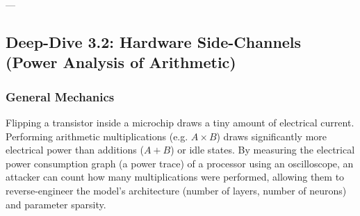 \documentclass{article}
\begin{document}
---

\subsection{Deep-Dive 3.2: Hardware Side-Channels (Power Analysis of Arithmetic)}

\subsubsection{General Mechanics}
Flipping a transistor inside a microchip draws a tiny amount of electrical current. Performing arithmetic multiplications (e.g. $A \times B$) draws significantly more electrical power than additions ($A + B$) or idle states. By measuring the electrical power consumption graph (a power trace) of a processor using an oscilloscope, an attacker can count how many multiplications were performed, allowing them to reverse-engineer the model's architecture (number of layers, number of neurons) and parameter sparsity.
\end{document}
